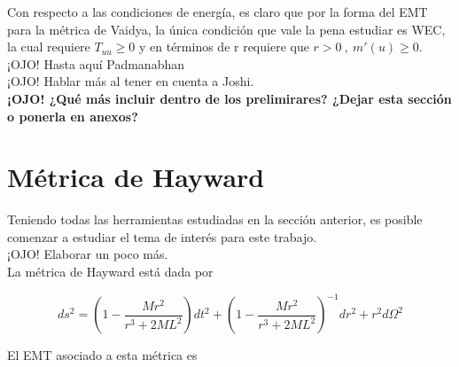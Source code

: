 \documentclass[prb,aps,preprintnumbers,amsmath,amssymb]{article}
\numberwithin{equation}{section}
\begin{document}
Con respecto a las condiciones de energía, es claro que por la forma del EMT para la métrica de Vaidya, la única condición que vale la pena estudiar es WEC, la cual requiere $T_{uu} \geq 0$ y en términos de r requiere que $r > 0\ ,\ m'(u)\geq 0 $.\\


¡OJO! Hasta aquí Padmanabhan\\

¡OJO! Hablar más al tener en cuenta a Joshi.\\

\textbf{¡OJO! ¿Qué más incluir dentro de los prelimirares? ¿Dejar esta sección o ponerla en anexos?}\\

\section{Métrica de Hayward}

Teniendo todas las herramientas estudiadas en la sección anterior, es posible comenzar a estudiar el tema de interés para este trabajo.\\

¡OJO! Elaborar un poco más.\\

La métrica de Hayward está dada por 

\begin{equation}
ds^2 = \left( 1 - \frac{Mr^2}{r^3 + 2ML^2} \right) dt^2 + \left( 1 - \frac{Mr^2}{r^3 + 2ML^2} \right)^{-1} dr^2 + r^2d\Omega ^2
\end{equation}

El EMT asociado a esta métrica es
\end{document}
